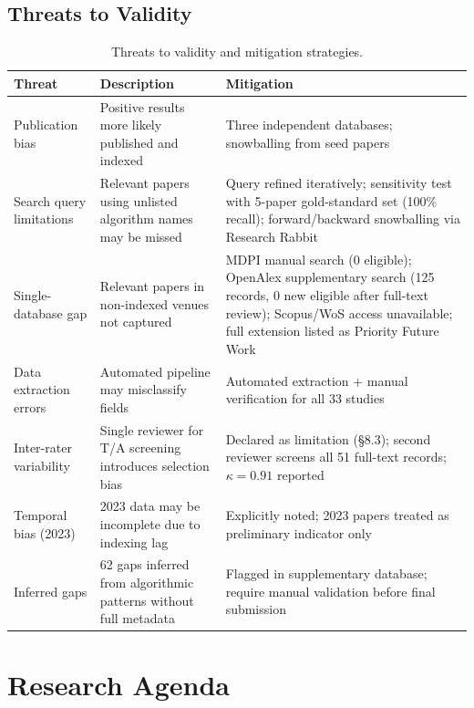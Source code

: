 \documentclass[review,3p,times]{elsarticle}
\begin{document}
\subsection{Threats to Validity}
\begin{table}[p]
\centering
\caption{Threats to validity and mitigation strategies.}
\label{tab:threats}
\small
\begin{tabularx}{\textwidth}{p{3cm}XX}
\toprule
\textbf{Threat} & \textbf{Description} & \textbf{Mitigation} \\
\midrule
Publication bias & Positive results more likely published and indexed & Three independent databases; snowballing from seed papers \\[4pt]
Search query limitations & Relevant papers using unlisted algorithm names may be missed & Query refined iteratively; sensitivity test with 5-paper gold-standard set (100\% recall); forward/backward snowballing via Research Rabbit \\[4pt]
Single-database gap & Relevant papers in non-indexed venues not captured & MDPI manual search (0 eligible); OpenAlex supplementary search (125 records, 0 new eligible after full-text review); Scopus/WoS access unavailable; full extension listed as Priority Future Work \\[4pt]
Data extraction errors & Automated pipeline may misclassify fields & Automated extraction + manual verification for all 33 studies \\[4pt]
Inter-rater variability & Single reviewer for T/A screening introduces selection bias & Declared as limitation (§8.3); second reviewer screens all 51 full-text records; $\kappa=0.91$ reported \\[4pt]
Temporal bias (2023) & 2023 data may be incomplete due to indexing lag & Explicitly noted; 2023 papers treated as preliminary indicator only \\[4pt]
Inferred gaps & 62 gaps inferred from algorithmic patterns without full metadata & Flagged in supplementary database; require manual validation before final submission \\
\bottomrule
\end{tabularx}
\end{table}

\section{Research Agenda}
\end{document}

